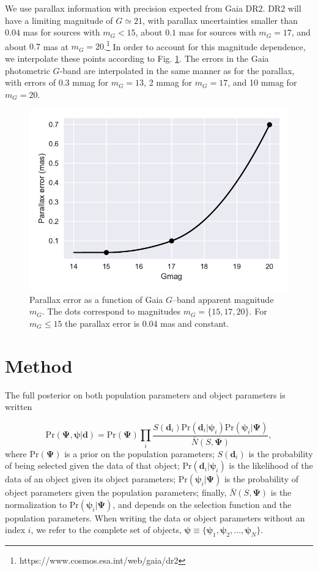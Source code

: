 \documentclass[fleqn,usenatbib]{mnras}
\newcommand{\popp}{\boldsymbol{\Psi}}
\newcommand{\objp}{\boldsymbol{\psi}}
\newcommand{\data}{\mathbf{d}}
\newcommand{\pr}{\text{Pr}}
\begin{document}
We use parallax information with precision expected from Gaia DR2. DR2 will have a limiting magnitude of $G \simeq 21$, with parallax uncertainties smaller than $0.04$ mas for sources with $m_G<15$, about $0.1$ mas for sources with $m_G=17$, and about $0.7$ mas at $m_G=20$.\footnote{https://www.cosmos.esa.int/web/gaia/dr2} In order to account for this magnitude dependence, we interpolate these points according to Fig. \ref{fig:parallax_error}. The errors in the Gaia photometric $G$-band are interpolated in the same manner as for the parallax, with errors of 0.3 mmag for $m_G = 13$, 2 mmag for $m_G = 17$, and 10 mmag for $m_G = 20$.

\begin{figure}
	\includegraphics[width=\columnwidth]{parallax_error.pdf}
    \caption{Parallax error as a function of Gaia $G$--band apparent magnitude $m_G$. The dots correspond to magnitudes $m_G=\{15,17,20\}$. For $m_G\leq 15$ the parallax error is 0.04 mas and constant.}
    \label{fig:parallax_error}
\end{figure}





\section{Method}\label{sec:method}

The full posterior on both population parameters and object parameters is written

\begin{equation}\label{eq:fullposterior}
	\pr(\popp,\objp | \data ) = \pr(\popp)
    \prod_i \frac{S(\data_i) \pr(\data_i|\objp_i) \pr(\objp_i | \popp)}{\bar{N}(S,\popp)},
\end{equation}
where $\pr(\popp)$ is a prior on the population parameters; $S(\data_i)$ is the probability of being selected given the data of that object; $\pr(\data_i|\objp_i)$ is the likelihood of the data of an object given its object parameters; $\pr(\objp_i | \popp)$ is the probability of object parameters given the population parameters; finally, $\bar{N}(S,\popp)$ is the normalization to $\pr(\objp_i | \popp)$, and depends on the selection function and the population parameters. When writing the data or object parameters without an index $i$, we refer to the complete set of objects, $\objp \equiv \{ \objp_1,\objp_2,...,\objp_N \}$.
\end{document}
